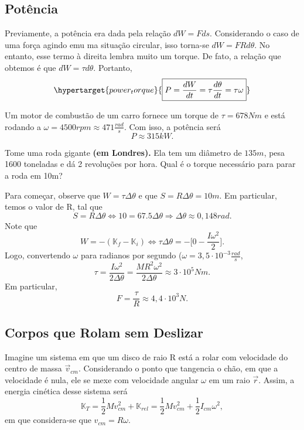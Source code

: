 \documentclass[PhysicsII/physicsII_notes.tex]{subfiles}
\begin{document}
\subsection{Potência}
Previamente, a potência era dada pela relação \(dW = F ds.\) Considerando o caso de uma força agindo
emu ma situação circular, isso torna-se \(dW = FRd\theta \). No entanto, esse termo à direita lembra muito um torque. De fato,
a relação que obtemos é que \(dW = \tau d\theta \). Portanto,
\[
	\hypertarget{power_torque}{\boxed{P = \frac{dW}{dt} = \tau \frac{d\theta }{dt} = \tau \omega }}
\]
\begin{example}
	Um motor de combustão de um carro fornece um torque de \(\tau  = 678Nm\) e está rodando a \(\omega = 4500rpm \approx 471 \frac{rad}{s}\).
	Com isso, a potência será
	\[
		P\approx 315kW.
	\]
\end{example}
\begin{example}
	Tome uma roda gigante \textbf{(em Londres).} Ela tem um diâmetro de \(135m\), pesa 1600 toneladas e dá 2 revoluções por hora.
	Qual é o torque necessário para parar a roda em 10m?

	Para começar, observe que \(W = \tau \Delta \theta \) e que \(S = R\Delta \theta = 10m.\) Em particular, temos o valor de R, tal que
	\[
		S = R\Delta \theta \Longleftrightarrow 10 = 67.5\Delta \theta \Rightarrow \Delta \theta \approx 0,148rad.
	\]
	Note que
	\[
		W = -(\mathbb{K}_{f} - \mathbb{K}_{i}) \Longleftrightarrow \tau \Delta \theta = -\biggl[0 - \frac{I\omega^{2}}{2}\biggr].
	\]
	Logo, convertendo \(\omega \) para radianos por segundo (\(\omega = 3,5 \cdot 10^{-3}\frac{rad}{s}\),
	\[
		\tau = \frac{I\omega^{2}}{2\Delta \theta } = \frac{MR^{2}\omega^{2}}{2\Delta \theta } \approx 3 \cdot 10^{5}Nm.
	\]
	Em particular,
	\[
		F = \frac{\tau }{R}\approx 4,4 \cdot 10^{3}N.
	\]
\end{example}
\subsection{Corpos que Rolam sem Deslizar}
Imagine um sistema em que um disco de raio R está a rolar com velocidade do centro de massa \(\vec{v}_{cm}.\) Considerando o ponto que tangencia o chão, em que a velocidade é nula,
ele se mexe com velocidade angular \(\omega \) em um raio \(\vec{r}\). Assim, a energia cinética desse sistema será
\[
	\mathbb{K}_{T} = \frac{1}{2} Mv_{cm}^{2} + \mathbb{K}_{rel} = \frac{1}{2}Mv_{cm}^{2} + \frac{1}{2}I_{cm}\omega ^{2},
\]
em que considera-se que \(v_{cm} = R\omega.\)
\end{document}
